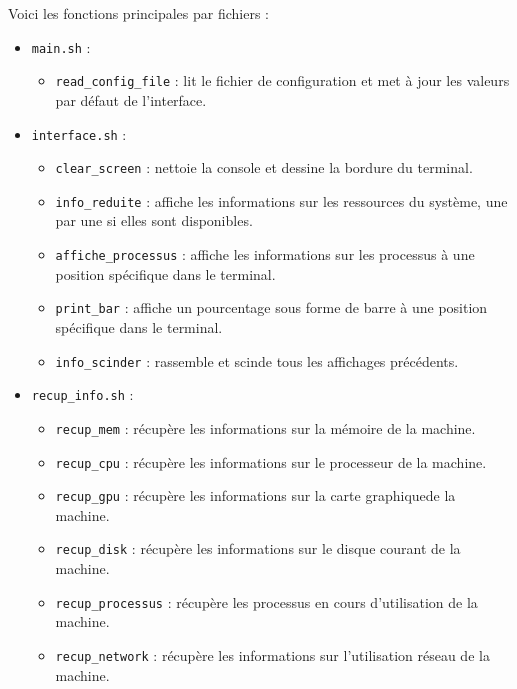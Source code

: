 \documentclass{article}
\begin{document}
\newpage
Voici les fonctions principales par fichiers :
\begin{itemize}
    \item \texttt{main.sh} :
        \begin{itemize}[label=\textbullet]
            \item \texttt{read\_config\_file} : lit le fichier de configuration et met à jour les valeurs par défaut de l'interface.
        \end{itemize}
    \vspace{0.3em}
    \item \texttt{interface.sh} :
        \begin{itemize}[label=\textbullet]
            \item {\texttt{clear\_screen}} : nettoie la console et dessine la bordure du terminal.
            \item \texttt{info\_reduite} : affiche les informations sur les ressources du système, une par une si elles sont disponibles.
            \item \texttt{affiche\_processus} : affiche les informations sur les processus à une position spécifique dans le terminal.
            \item \texttt{print\_bar} : affiche un pourcentage sous forme de barre à une position spécifique dans le terminal.
            \item \texttt{info\_scinder} : rassemble et scinde tous les affichages précédents.
        \end{itemize}
        \vspace{0.3em}
    \item \texttt{recup\_info.sh} :
        \begin{itemize}[label=\textbullet]
            \item \texttt{recup\_mem} : récupère les informations sur la mémoire de la machine.
            \item \texttt{recup\_cpu} : récupère les informations sur le processeur de la machine.
            \item \texttt{recup\_gpu} : récupère les informations sur la carte graphiquede la machine.
            \item \texttt{recup\_disk} : récupère les informations sur le disque courant de la machine.
            \item \texttt{recup\_processus} : récupère les processus en cours d'utilisation de la machine.
            \item \texttt{recup\_network} : récupère les informations sur l'utilisation réseau de la machine.

\end{itemize}
\end{itemize}
\end{document}
